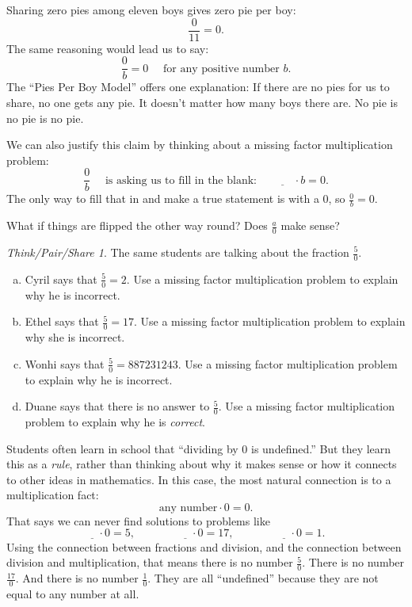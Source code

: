 \documentclass[10pt, reqno]{amsart}
\theoremstyle{remark}
\newtheorem*{thinkpair*}{Think/Pair/Share}
\theoremstyle{definition}
\numberwithin{equation}{section}  %
\begin{document}
Sharing zero pies among eleven boys gives zero pie per boy:
\[
\frac 0 {11} = 0.
\]
The same reasoning would lead us to say:
\[
\frac 0 b = 0 \quad \text{ for any positive number } b.
\]
The ``Pies Per Boy Model'' offers one explanation: If there are no pies for us to share, no one gets any pie.  It doesn't matter how many boys there are.  No pie is no pie is no pie.

We can also justify this claim by thinking about a missing factor multiplication problem:
\[
\frac 0 b 
\quad 
\text{ is asking us to fill in the blank: }
\quad
\underline{\qquad} \cdot b = 0.
\]
The only way to fill that in and make a true statement is with a 0, so $\frac 0 b = 0$.



What if things are flipped the other way round?
Does $\frac{a}0$ make sense?  

\begin{thinkpair*}
The same students are talking about the fraction $\frac 5 0$.
\begin{enumerate}[(a)]
\item
Cyril says that $\frac 5 0  = 2$.  Use a missing factor multiplication problem to explain why he is incorrect.\\

\item
Ethel says that $\frac 5 0 = 17$.  Use a missing factor multiplication problem to explain why she is incorrect.\\

\item
Wonhi says that $\frac 5 0  = 887231243$.  Use a missing factor multiplication problem to explain why he is incorrect.\\

\item
Duane says that there is no answer to $\frac 5 0$.  Use a missing factor multiplication problem to explain why he is \emph{correct}.
\end{enumerate}
\end{thinkpair*}

Students often learn in school that ``dividing by 0 is undefined.'' But they learn this as a \emph{rule}, rather than thinking about why it makes sense or how it connects to other ideas in mathematics.  In this case, the most natural connection is to a multiplication fact:
\[
\text{any number} \cdot 0 = 0.
\]
That says we can never find solutions to problems like
 \[
\underline{\quad} \cdot 0 = 5,
\qquad\qquad
\underline{\quad} \cdot 0 = 17,
\qquad\qquad
\underline{\quad} \cdot 0 = 1.
\]
Using the connection between fractions and division, and the connection between division and multiplication, that means there is no number $\frac 5 0$.  There is no number $\frac {17}0$.  And there is no number $\frac 1 0$.  They are all ``undefined'' because they are not equal to any number at all.
\end{document}

